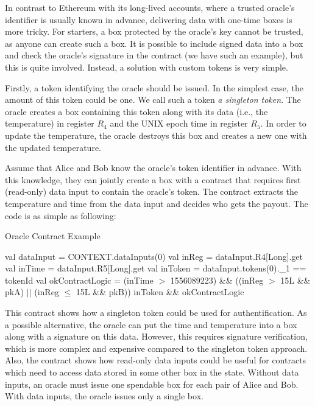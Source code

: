  In contrast to Ethereum with its long-lived accounts, where a trusted oracle's identifier is usually known in advance, delivering data with one-time boxes is more tricky. For starters, a box protected by the oracle's key cannot be trusted, as anyone can create such a box. It is possible to include signed data into a box and check the oracle's signature in the contract (we have such an example), but this is quite involved. Instead, a solution with custom
 tokens is very simple.

 Firstly, a token identifying the oracle should be issued. In the simplest case, the amount of this token could be one. We call such a token {\em a singleton token}. The oracle creates a box containing this token along with its data (i.e., the temperature) in register $R_4$ and the UNIX epoch time in register $R_5$.
 In order to update the temperature, the oracle destroys this box and creates a new one with the updated temperature.

 Assume that Alice and Bob know the oracle's token identifier in advance. With this knowledge, they can jointly create a box with a contract that requires first (read-only) data input to contain the oracle's token. The contract extracts the temperature and time from the data input
 and decides who gets the payout. The code is as simple as following:

 \begin{algorithm}[H]
    \caption{Oracle Contract Example}
    \label{alg:oracle}
    \begin{algorithmic}[1]
        \State val dataInput = CONTEXT.dataInputs(0)
        \State val inReg = dataInput.R4[Long].get
        \State val inTime = dataInput.R5[Long].get
        \State val inToken = dataInput.tokens(0).\_1 == tokenId
        \State val okContractLogic = (inTime $>$ 1556089223) \&\&
        \State\hspace{\algorithmicindent}\hspace{\algorithmicindent} ((inReg $>$ 15L \&\& pkA) $||$ (inReg $\le$ 15L \&\& pkB))
        \State inToken \&\& okContractLogic
    \end{algorithmic}
 \end{algorithm}

 This contract shows how a singleton token could be used for authentification. As a possible alternative, the oracle
 can put the time and temperature into a box along with a signature on this data. However, this requires signature verification, which is more complex and expensive compared to
 the singleton token approach. Also, the contract shows how read-only data inputs could be useful for contracts which need to access data stored in some other box in the state. Without data inputs, an oracle must issue one spendable box for each
 pair of Alice and Bob. With data inputs, the oracle issues only a single box.

